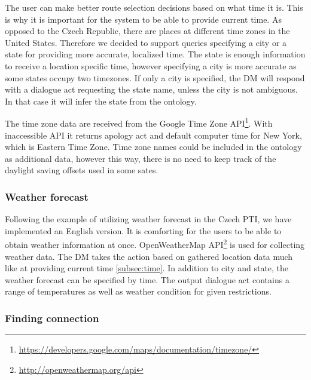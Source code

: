 The user can make better route selection decisions based on what time it is.
This is why it is important for the system to be able to provide current time.
As opposed to the Czech Republic, there are places at different time zones in the United States.
Therefore we decided to support queries specifying a city or a state for providing more accurate, localized time.
The state is enough information to receive a location specific time, however specifying a city is more accurate as some states occupy two timezones.
If only a city is specified, the DM will respond with a dialogue act requesting the state name, unless the city is not ambiguous.
In that case it will infer the state from the ontology.

The time zone data are received from the Google Time Zone API\footnote{\url{https://developers.google.com/maps/documentation/timezone/}}. With inaccessible API it returns apology act and default computer time for New York, which is Eastern Time Zone.
Time zone names could be included in the ontology as additional data, however this way, there is no need to keep track of the daylight saving offsets used in some sates.

\subsubsection{Weather forecast}

Following the example of utilizing weather forecast in the Czech PTI, we have implemented an English version.
It is comforting for the users to be able to obtain weather information at once.
OpenWeatherMap API\footnote{\url{http://openweathermap.org/api}} is used for collecting weather data.
The DM takes the action based on gathered location data much like at providing current time \ref{subsec:time}.
In addition to city and state, the weather forecast can be specified by time.
The output dialogue act contains a range of temperatures as well as weather condition for given restrictions.

\subsubsection{Finding connection}

